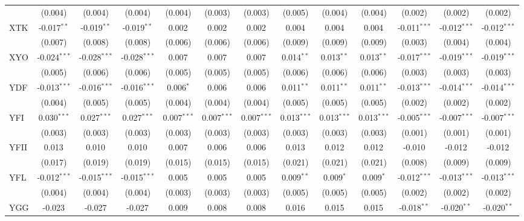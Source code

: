 \begin{table}[!htbp]
\begin{tabular}{@{\extracolsep{5pt}}lcccccccccccc}
  & (0.004) & (0.004) & (0.004) & (0.004) & (0.003) & (0.003) & (0.005) & (0.004) & (0.004) & (0.002) & (0.002) & (0.002) \\
 XTK & -0.017$^{**}$ & -0.019$^{**}$ & -0.019$^{**}$ & 0.002$^{}$ & 0.002$^{}$ & 0.002$^{}$ & 0.004$^{}$ & 0.004$^{}$ & 0.004$^{}$ & -0.011$^{***}$ & -0.012$^{***}$ & -0.012$^{***}$ \\
  & (0.007) & (0.008) & (0.008) & (0.006) & (0.006) & (0.006) & (0.009) & (0.009) & (0.009) & (0.003) & (0.004) & (0.004) \\
 XYO & -0.024$^{***}$ & -0.028$^{***}$ & -0.028$^{***}$ & 0.007$^{}$ & 0.007$^{}$ & 0.007$^{}$ & 0.014$^{**}$ & 0.013$^{**}$ & 0.013$^{**}$ & -0.017$^{***}$ & -0.019$^{***}$ & -0.019$^{***}$ \\
  & (0.005) & (0.006) & (0.006) & (0.005) & (0.005) & (0.005) & (0.006) & (0.006) & (0.006) & (0.003) & (0.003) & (0.003) \\
 YDF & -0.013$^{***}$ & -0.016$^{***}$ & -0.016$^{***}$ & 0.006$^{*}$ & 0.006$^{}$ & 0.006$^{}$ & 0.011$^{**}$ & 0.011$^{**}$ & 0.011$^{**}$ & -0.013$^{***}$ & -0.014$^{***}$ & -0.014$^{***}$ \\
  & (0.004) & (0.005) & (0.005) & (0.004) & (0.004) & (0.004) & (0.005) & (0.005) & (0.005) & (0.002) & (0.002) & (0.002) \\
 YFI & 0.030$^{***}$ & 0.027$^{***}$ & 0.027$^{***}$ & 0.007$^{***}$ & 0.007$^{***}$ & 0.007$^{***}$ & 0.013$^{***}$ & 0.013$^{***}$ & 0.013$^{***}$ & -0.005$^{***}$ & -0.007$^{***}$ & -0.007$^{***}$ \\
  & (0.003) & (0.003) & (0.003) & (0.003) & (0.003) & (0.003) & (0.003) & (0.003) & (0.003) & (0.001) & (0.001) & (0.001) \\
 YFII & 0.013$^{}$ & 0.010$^{}$ & 0.010$^{}$ & 0.007$^{}$ & 0.006$^{}$ & 0.006$^{}$ & 0.013$^{}$ & 0.012$^{}$ & 0.012$^{}$ & -0.010$^{}$ & -0.012$^{}$ & -0.012$^{}$ \\
  & (0.017) & (0.019) & (0.019) & (0.015) & (0.015) & (0.015) & (0.021) & (0.021) & (0.021) & (0.008) & (0.009) & (0.009) \\
 YFL & -0.012$^{***}$ & -0.015$^{***}$ & -0.015$^{***}$ & 0.005$^{}$ & 0.005$^{}$ & 0.005$^{}$ & 0.009$^{**}$ & 0.009$^{*}$ & 0.009$^{*}$ & -0.012$^{***}$ & -0.013$^{***}$ & -0.013$^{***}$ \\
  & (0.004) & (0.004) & (0.004) & (0.003) & (0.003) & (0.003) & (0.005) & (0.005) & (0.005) & (0.002) & (0.002) & (0.002) \\
 YGG & -0.023$^{}$ & -0.027$^{}$ & -0.027$^{}$ & 0.009$^{}$ & 0.008$^{}$ & 0.008$^{}$ & 0.016$^{}$ & 0.015$^{}$ & 0.015$^{}$ & -0.018$^{**}$ & -0.020$^{**}$ & -0.020$^{**}$ \\

\end{tabular}
\end{table}
